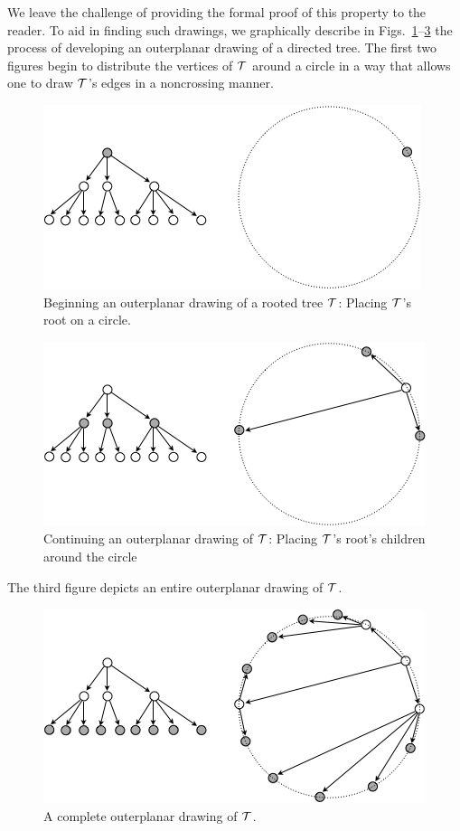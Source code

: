 We leave the challenge of providing the formal proof of this property to the reader.  To aid in finding such drawings, we graphically describe in Figs.~\ref{fig:treeoutplanar1}--\ref{fig:treeoutplanar3} the process of developing an outerplanar drawing of a directed tree.  The first two figures begin to distribute the vertices of $\mbox{$\cal T$}$ around a circle in a way that allows one to draw $\mbox{$\cal T$}$'s edges in a noncrossing manner.
\begin{figure}[hbt]
\begin{center}
       \includegraphics[scale=0.45]{FiguresGraph/TreeOutplanar1}
       \caption{Beginning an outerplanar drawing of a rooted tree $\mbox{$\cal T$}$: Placing $\mbox{$\cal T$}$'s root on a circle.}
  \label{fig:treeoutplanar1}
\end{center}
\end{figure}
\begin{figure}[hbt]
\begin{center}
       \includegraphics[scale=0.45]{FiguresGraph/TreeOutplanar2}
       \caption{Continuing an outerplanar drawing of $\mbox{$\cal T$}$: Placing $\mbox{$\cal T$}$'s root's children around the circle}
  \label{fig:treeoutplanar2}
\end{center}
\end{figure}
The third figure depicts an entire outerplanar drawing of $\mbox{$\cal T$}$.
\begin{figure}[hbt]
\begin{center}
       \includegraphics[scale=0.45]{FiguresGraph/TreeOutplanar3}
       \caption{A complete outerplanar drawing of $\mbox{$\cal T$}$.}
  \label{fig:treeoutplanar3}
\end{center}
\end{figure}

